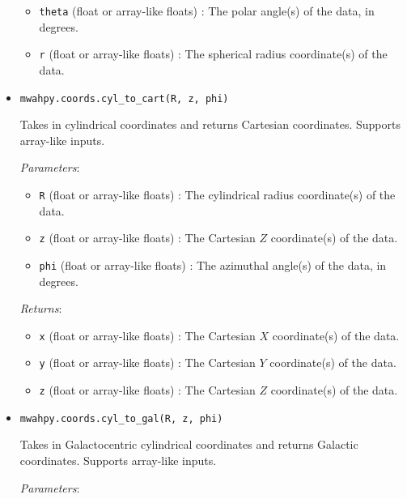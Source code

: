 \documentclass{article}
\begin{document}
\begin{itemize}
\begin{itemize}
\item \verb!theta! (float or array-like floats) : The polar angle(s) of the data, in degrees.

\item \verb!r! (float or array-like floats) : The spherical radius coordinate(s) of the data.

\end{itemize}



\item \verb!mwahpy.coords.cyl_to_cart(R, z, phi)!

Takes in cylindrical coordinates and returns Cartesian coordinates. Supports array-like inputs.

\textit{Parameters}: \begin{itemize}

\item \verb!R! (float or array-like floats) : The cylindrical radius coordinate(s) of the data.

\item \verb!z! (float or array-like floats) : The Cartesian $Z$ coordinate(s) of the data.

\item \verb!phi! (float or array-like floats) : The azimuthal angle(s) of the data, in degrees.

\end{itemize}

\textit{Returns}: \begin{itemize}

\item \verb!x! (float or array-like floats) : The Cartesian $X$ coordinate(s) of the data.

\item \verb!y! (float or array-like floats) : The Cartesian $Y$ coordinate(s) of the data.

\item \verb!z! (float or array-like floats) : The Cartesian $Z$ coordinate(s) of the data.

\end{itemize}



\item \verb!mwahpy.coords.cyl_to_gal(R, z, phi)!

Takes in Galactocentric cylindrical coordinates and returns Galactic coordinates. Supports array-like inputs.

\textit{Parameters}: \begin{itemize}


\end{itemize}
\end{itemize}
\end{document}
